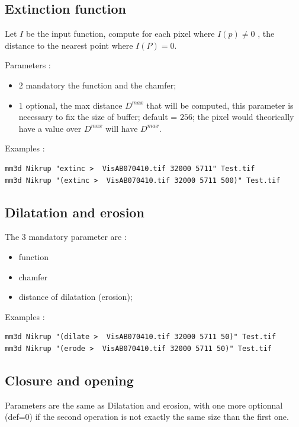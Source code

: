 \subsection{Extinction function}

Let $I$ be the input function, compute for each pixel where $I(p) \neq 0$ , the
distance to the nearest point where $I(P) = 0$.

Parameters :

\begin{itemize}
   \item   $2$ mandatory the function and the chamfer;
   \item   $1$ optional, the max distance  $D^{max}$ that will be computed,
           this parameter is necessary to fix the size of buffer;
           default = $256$; the pixel would theorically have  a value
           over  $D^{max}$ will have  $D^{max}$.
\end{itemize}

Examples : 

\begin{verbatim}
mm3d Nikrup "extinc >  VisAB070410.tif 32000 5711" Test.tif
mm3d Nikrup "(extinc >  VisAB070410.tif 32000 5711 500)" Test.tif
\end{verbatim}


\subsection{Dilatation and erosion}

The $3$ mandatory parameter are  :

\begin{itemize}
   \item  function
   \item  chamfer
   \item  distance of dilatation (erosion);
\end{itemize}
   
Examples : 

\begin{verbatim}
mm3d Nikrup "(dilate >  VisAB070410.tif 32000 5711 50)" Test.tif
mm3d Nikrup "(erode >  VisAB070410.tif 32000 5711 50)" Test.tif
\end{verbatim}

\subsection{Closure and opening}

Parameters are the same as Dilatation and erosion, with one more
optionnal (def=0) if the  second operation is not exactly the  same
size than the first one.

